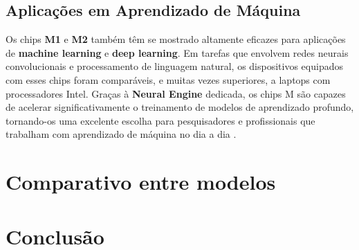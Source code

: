 \documentclass[a4paper,times,12pt]{article}
\begin{document}
\subsection{Aplicações em Aprendizado de Máquina}

Os chips \textbf{M1} e \textbf{M2} também têm se mostrado altamente eficazes para aplicações de \textbf{machine learning} e \textbf{deep learning}. Em tarefas que envolvem redes neurais convolucionais e processamento de linguagem natural, os dispositivos equipados com esses chips foram comparáveis, e muitas vezes superiores, a laptops com processadores Intel. Graças à \textbf{Neural Engine} dedicada, os chips M são capazes de acelerar significativamente o treinamento de modelos de aprendizado profundo, tornando-os uma excelente escolha para pesquisadores e profissionais que trabalham com aprendizado de máquina no dia a dia \cite{usability_ml, apple_silicon_potential}.

\section{Comparativo entre modelos}
\hspace{+15pt}


\section{Conclusão}
\hspace{+15pt}
\end{document}
